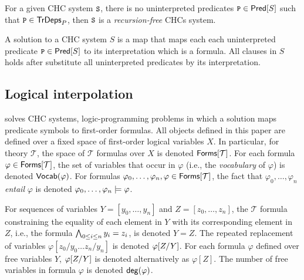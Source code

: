 %
For a given CHC system $\cc{S}$, there is no uninterpreted predicates $\cc{P} \in \predof{S}$ 
such that $\cc{P} \in \tdepsof{P}$, then $\cc{S}$ is a \emph{recursion-free} CHCs system.
%

%
A solution to a CHC system $S$ is a map that maps each each
uninterpreted predicate $\cc{P} \in \predof{S}$ to its interpretation which is a formula.
%
All clauses in $S$ holds
after substitute all uninterpreted predicates by its interpretation.

\subsection{Logical interpolation}
\label{sec:itps}
%
\sys solves CHC systems, logic-programming problems in which a
solution maps predicate symbols to first-order formulas.
%
All objects defined in this paper are defined over a fixed space of
first-order logical variables $X$.
%
In particular, for theory $\mathcal{T}$, the space of $\mathcal{T}$
formulas over $X$ is denoted $\tformulas{\mathcal{T}}$.
%
For each formula $\varphi \in \tformulas{\mathcal{T}}$, the set of
variables that occur in $\varphi$ (i.e., the \emph{vocabulary} of
$\varphi$) is denoted $\vocab(\varphi)$.
For formulas $\varphi_0, \ldots, \varphi_n, \varphi \in
\tformulas{\mathcal{T}}$, the fact that $\varphi_0, \ldots, \varphi_n$
\emph{entail} $\varphi$ is denoted $\varphi_0, \ldots, \varphi_n
\entails \varphi$.

For sequences of variables $Y = [ y_0, \ldots, y_n ]$ and $Z = [ z_0,
\ldots, z_n ]$, the $\mathcal{T}$ formula constraining the equality of
each element in $Y$ with its corresponding element in $Z$, i.e., the
formula $\bigland_{0 \leq i \leq n} y_i = z_i$, is denoted $Y = Z$.
%
The repeated replacement of variables $\varphi[ z_0 / y_0 \ldots z_{n}
/ y_{n} ]$ is denoted $\replace{\varphi}{Y}{Z}$.
%
For each formula $\varphi$ defined over free variables $Y$,
$\replace{\varphi}{Y}{Z}$ is denoted alternatively as $\varphi[ Z ]$.
%
The number of free variables in formula $\varphi$ is denoted
$\degreeof{\varphi}$.


